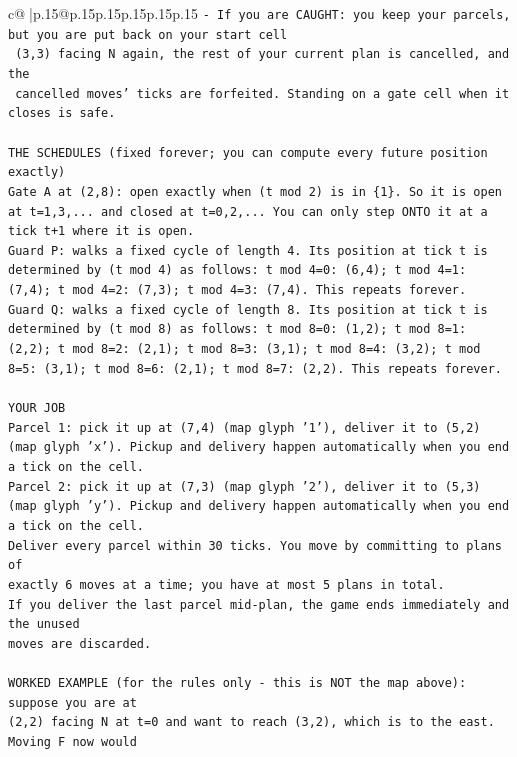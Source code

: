 \documentclass{article}
\begin{document}
{\begin{supertabular}{c@{$\;$}|p{.15\linewidth}@{}p{.15\linewidth}p{.15\linewidth}p{.15\linewidth}p{.15\linewidth}p{.15\linewidth}}
{{{\texttt{{-} If you are CAUGHT: you keep your parcels, but you are put back on your start cell} \\
\texttt{  (3,3) facing N again, the rest of your current plan is cancelled, and the} \\
\texttt{  cancelled moves' ticks are forfeited. Standing on a gate cell when it closes is safe.} \\
\\ 
\texttt{THE SCHEDULES (fixed forever; you can compute every future position exactly)} \\
\texttt{Gate A at (2,8): open exactly when (t mod 2) is in \{1\}. So it is open at t=1,3,... and closed at t=0,2,... You can only step ONTO it at a tick t+1 where it is open.} \\
\texttt{Guard P: walks a fixed cycle of length 4. Its position at tick t is determined by (t mod 4) as follows: t mod 4=0: (6,4); t mod 4=1: (7,4); t mod 4=2: (7,3); t mod 4=3: (7,4). This repeats forever.} \\
\texttt{Guard Q: walks a fixed cycle of length 8. Its position at tick t is determined by (t mod 8) as follows: t mod 8=0: (1,2); t mod 8=1: (2,2); t mod 8=2: (2,1); t mod 8=3: (3,1); t mod 8=4: (3,2); t mod 8=5: (3,1); t mod 8=6: (2,1); t mod 8=7: (2,2). This repeats forever.} \\
\\ 
\texttt{YOUR JOB} \\
\texttt{Parcel 1: pick it up at (7,4) (map glyph '1'), deliver it to (5,2) (map glyph 'x'). Pickup and delivery happen automatically when you end a tick on the cell.} \\
\texttt{Parcel 2: pick it up at (7,3) (map glyph '2'), deliver it to (5,3) (map glyph 'y'). Pickup and delivery happen automatically when you end a tick on the cell.} \\
\texttt{Deliver every parcel within 30 ticks. You move by committing to plans of} \\
\texttt{exactly 6 moves at a time; you have at most 5 plans in total.} \\
\texttt{If you deliver the last parcel mid{-}plan, the game ends immediately and the unused} \\
\texttt{moves are discarded.} \\
\\ 
\texttt{WORKED EXAMPLE (for the rules only {-} this is NOT the map above): suppose you are at} \\
\texttt{(2,2) facing N at t=0 and want to reach (3,2), which is to the east. Moving F now would} \\
}}}
\end{supertabular}}
\end{document}
